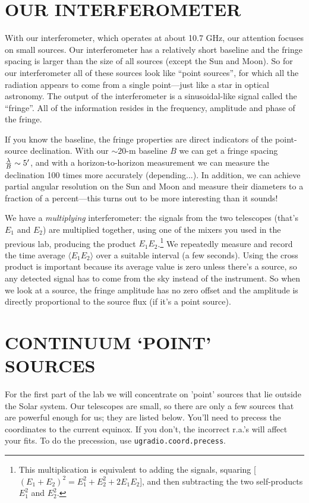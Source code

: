 \documentclass[11pt,preprint]{aastex}
\begin{document}
\section{OUR INTERFEROMETER}

	With our interferometer, which operates at about 10.7 GHz, our
attention focuses on small sources.  Our interferometer has a relatively
short baseline and the fringe spacing is larger than the size of all
sources (except the Sun and Moon).  So for our interferometer all of
these sources look like ``point sources'', for which all the radiation
appears to come from a single point---just like a star in optical
astronomy.  The output of the interferometer is a sinusoidal-like signal
called the ``fringe''. All of the information resides in the frequency,
amplitude and phase of the fringe.

 If you know the baseline, the fringe properties are direct indicators
 of the point-source declination.  With our $\sim 20$-m baseline $B$ we
 can get a fringe spacing ${\lambda \over B}\sim 5'$, and with a
 horizon-to-horizon measurement we can measure the declination 100 times
 more accurately (depending...).  In addition, we can achieve partial
 angular resolution on the Sun and Moon and measure their diameters to a
 fraction of a percent---this turns out to be more interesting than it
 sounds!

We have a {\it multiplying} interferometer: the signals from the two
telescopes (that's $E_1$ and $E_2$) are multiplied together, using one
of the mixers you used in the previous lab, producing the product
$E_1E_2$.\footnote{This multiplication is equivalent to adding the
signals, squaring [$(E_1 + E_2)^2 = E_1^2 + E_2^2 + 2E_1E_2$], and then
subtracting the two self-products $E_1^2$ and $E_2^2$.} We repeatedly
measure and record the time average $\langle E_1E_2 \rangle$ over a
suitable interval (a few seconds). Using the cross product is important
because its average value is zero unless there's a source, so any
detected signal has to come from the sky instead of the instrument.  So
when we look at a source, the fringe amplitude has no zero offset and
the amplitude is directly proportional to the source flux (if it's a
point source).


\section {CONTINUUM `POINT' SOURCES}

For the first part of the lab we will concentrate on 'point' sources
that lie outside the Solar system. Our telescopes are small, so there
are only a few sources that are powerful enough for us; they are listed
below.  You'll need to precess the coordinates to the current
equinox. If you don't, the incorrect r.a.'s will affect your fits. To do
the precession, use {\tt ugradio.coord.precess}.
\end{document}
